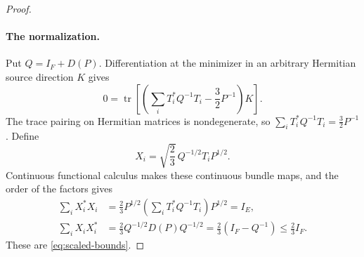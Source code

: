 \begin{proof}
\paragraph{The normalization.}
Put $Q=I_F+D(P)$.  Differentiation at the minimizer in an arbitrary
Hermitian source direction $K$ gives
\[
  0=\operatorname{tr}\left[
     \left(\sum_iT_i^*Q^{-1}T_i-\frac32 P^{-1}\right)K
   \right].
\]
The trace pairing on Hermitian matrices is nondegenerate, so
$\sum_iT_i^*Q^{-1}T_i=\frac32P^{-1}$.  Define
\[
  X_i=\sqrt{\frac23}\,Q^{-1/2}T_iP^{1/2}.
\]
Continuous functional calculus makes these continuous bundle maps, and
the order of the factors gives
\begin{align*}
  \sum_iX_i^*X_i
  &=\frac23 P^{1/2}\left(\sum_iT_i^*Q^{-1}T_i\right)P^{1/2}
    =I_E,\\
  \sum_iX_iX_i^*
  &=\frac23 Q^{-1/2}D(P)Q^{-1/2}
    =\frac23(I_F-Q^{-1})\leq\frac23 I_F.
\end{align*}
These are \eqref{eq:scaled-bounds}.
\end{proof}
